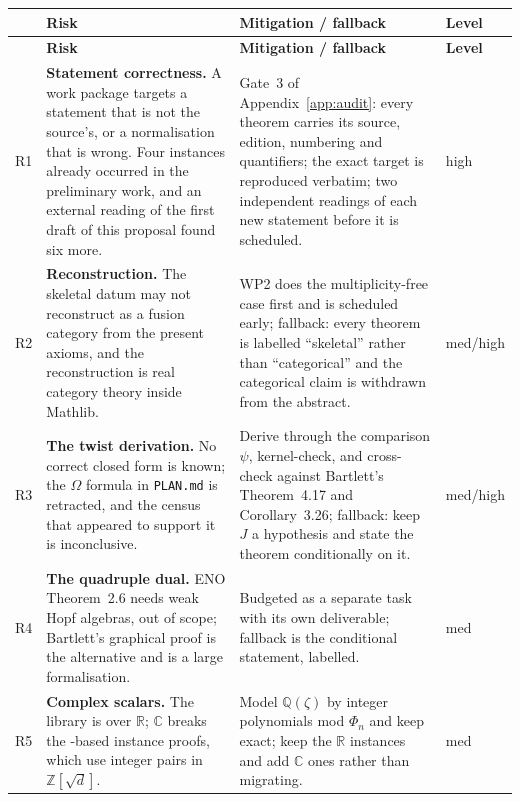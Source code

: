 \documentclass[11pt,a4paper]{article}
\theoremstyle{remark}
\newcommand{\code}[1]{\texttt{\detokenize{#1}}}
\newcommand{\R}{\mathbb{R}}
\newcommand{\Cx}{\mathbb{C}}
\newcommand{\Z}{\mathbb{Z}}
\newcommand{\Q}{\mathbb{Q}}
\begin{document}
{\small
\begin{longtable}{@{}>{\raggedright\arraybackslash}p{}>{\raggedright\arraybackslash}p{}>{\raggedright\arraybackslash}p{}>{\raggedright\arraybackslash}p{}@{}}
\toprule
& \textbf{Risk} & \textbf{Mitigation / fallback} & \textbf{Level} \\
\midrule
\endfirsthead
\toprule
& \textbf{Risk} & \textbf{Mitigation / fallback} & \textbf{Level} \\
\midrule
\endhead
\bottomrule
\endlastfoot
R1 & \textbf{Statement correctness.} A work package targets a statement that is not the
source's, or a normalisation that is wrong. Four instances already occurred in the preliminary
work, and an external reading of the first draft of this proposal found six more. & Gate~3 of Appendix~\ref{app:audit}: every
theorem carries its source, edition, numbering and quantifiers; the exact target is reproduced
verbatim; two independent readings of each new statement before it is scheduled. & high \\
R2 & \textbf{Reconstruction.} The skeletal datum may not reconstruct as a fusion category from the
present axioms, and the reconstruction is real category theory inside Mathlib. & WP2 does the
multiplicity-free case first and is scheduled early; fallback: every theorem is labelled
``skeletal'' rather than ``categorical'' and the categorical claim is withdrawn from the abstract.
& med/high \\
R3 & \textbf{The twist derivation.} No correct closed form is known; the $\Omega$ formula in
\texttt{PLAN.md} is retracted, and the census that appeared to support it is inconclusive. &
Derive through the comparison $\psi$, kernel-check, and cross-check against Bartlett's
Theorem~4.17 and Corollary~3.26; fallback: keep $J$ a hypothesis and state the theorem
conditionally on it. & med/high \\
R4 & \textbf{The quadruple dual.} ENO Theorem~2.6 needs weak Hopf algebras, out of scope;
Bartlett's graphical proof is the alternative and is a large formalisation. & Budgeted as a
separate task with its own deliverable; fallback is the conditional statement, labelled. & med \\
R5 & \textbf{Complex scalars.} The library is over $\R$; $\Cx$ breaks the \code{decide}-based
instance proofs, which use integer pairs in $\Z[\sqrt d]$. & Model $\Q(\zeta)$ by integer
polynomials mod $\Phi_n$ and keep \code{decide} exact; keep the $\R$ instances and add $\Cx$ ones
rather than migrating. & med \\

\end{longtable}}
\end{document}
